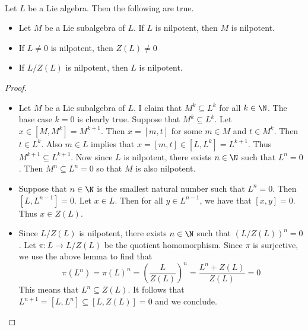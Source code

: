 \documentclass[a4paper]{article}
\begin{document}
\begin{lmm}{}{} \\Let $L$ be a Lie algebra. Then the following are true. 
\begin{itemize}
\item Let $M$ be a Lie subalgebra of $L$. If $L$ is nilpotent, then $M$ is nilpotent. 
\item If $L\neq 0$ is nilpotent, then $Z(L)\neq 0$
\item If $L/Z(L)$ is nilpotent, then $L$ is nilpotent. 
\end{itemize} 
\begin{proof}~\\
\begin{itemize}
\item Let $M$ be a Lie subalgebra of $L$. I claim that $M^k\subseteq L^k$ for all $k\in\N$. The base case $k=0$ is clearly true. Suppose that $M^k\subseteq L^k$. Let $x\in[M,M^k]=M^{k+1}$. Then $x=[m,t]$ for some $m\in M$ and $t\in M^k$. Then $t\in L^k$. Also $m\in L$ implies that $x=[m,t]\in[L,L^k]=L^{k+1}$. Thus $M^{k+1}\subseteq L^{k+1}$. Now since $L$ is nilpotent, there exists $n\in\N$ such that $L^n=0$. Then $M^n\subseteq L^n=0$ so that $M$ is also nilpotent. 
\item Suppose that $n\in\N$ is the smallest natural number such that $L^n=0$. Then $[L,L^{n-1}]=0$. Let $x\in L$. Then for all $y\in L^{n-1}$, we have that $[x,y]=0$. Thus $x\in Z(L)$. 
\item Since $L/Z(L)$ is nilpotent, there exists $n\in\N$ such that $(L/Z(L))^n=0$. Let $\pi:L\to L/Z(L)$ be the quotient homomorphism. Since $\pi$ is surjective, we use the above lemma to find that $$\pi(L^n)=\pi(L)^n=\left(\frac{L}{Z(L)}\right)^n=\frac{L^n+Z(L)}{Z(L)}=0$$ This means that $L^n\subseteq Z(L)$. It follows that $L^{n+1}=[L,L^n]\subseteq[L,Z(L)]=0$ and we conclude. 
\end{itemize}
\end{proof}
\end{lmm}
\end{document}
